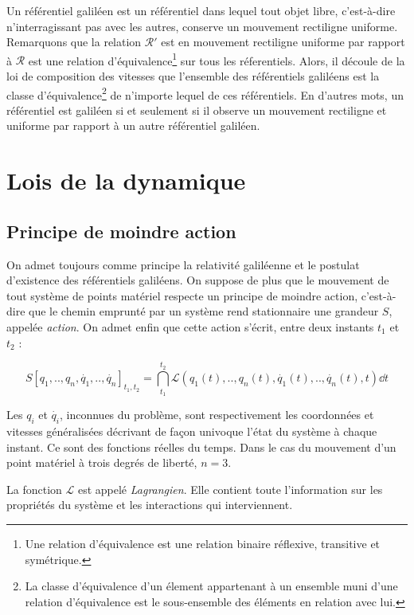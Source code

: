Un référentiel galiléen est un référentiel dans lequel tout objet libre, c'est-à-dire n'interragissant pas avec les autres, conserve un mouvement rectiligne uniforme. Remarquons que la relation \og $\mathcal{R}'$ est en mouvement rectiligne uniforme par rapport à $\mathcal{R}$ \fg est une relation d'équivalence\footnote{Une relation d'équivalence est une relation binaire réflexive, transitive et symétrique.} sur tous les réferentiels. Alors, il découle de la loi de composition des vitesses que l'ensemble des référentiels galiléens est la classe d'équivalence\footnote{La classe d'équivalence d'un élement appartenant à un ensemble muni d'une relation d'équivalence est le sous-ensemble des éléments en relation avec lui.} de n'importe lequel de ces référentiels.
En d'autres mots, un référentiel est galiléen si et seulement si il observe un mouvement rectiligne et uniforme par rapport à un autre référentiel galiléen.


\section{Lois de la dynamique}

\subsection{Principe de moindre action}

On admet toujours comme principe la relativité galiléenne et le postulat d'existence des référentiels galiléens. 
On suppose de plus que le mouvement de tout système de points matériel respecte un principe de moindre action, c'est-à-dire que le chemin emprunté par un système rend stationnaire une grandeur $S$, appelée \textit{action}.
On admet enfin que cette action s'écrit, entre deux instants $t_1$ et $t_2$ :

\begin{equation}
S[q_1, .., q_n, \dot{q_1}, .., \dot{q_n}]_{t_1,t_2} = \dint_{t_1}^{t_2} \mathcal{L}(q_1(t), .., q_n(t), \dot{q_1}(t), .., \dot{q_n} (t), t) \dd t
\end{equation}

Les $q_i$ et $\dot{q_i}$, inconnues du problème, sont respectivement les coordonnées et vitesses généralisées décrivant de façon univoque l'état du système à chaque instant. Ce sont des fonctions réelles du temps. Dans le cas du mouvement d'un point matériel à trois degrés de liberté, $n = 3$.

La fonction $\mathcal{L}$ est appelé \textit{Lagrangien}. Elle contient toute l'information sur les propriétés du système et les interactions qui interviennent.

